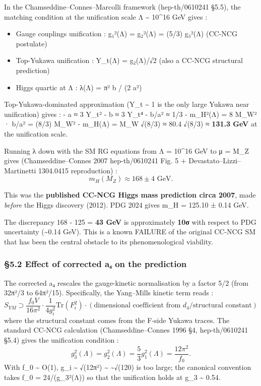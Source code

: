 \documentclass[
  11pt,
  a4paper,
]{article}
\providecommand{\tightlist}{\setlength{\itemsep}{0pt}\setlength{\parskip}{0pt}}
\providecommand{\tightlist}{%
  \setlength{\itemsep}{0pt}\setlength{\parskip}{0pt}}
\begin{document}
In the Chamseddine--Connes--Marcolli framework (hep-th/0610241 §5.5), the matching condition at the unification scale Λ \textasciitilde{} 10\^{}16 GeV gives :

\begin{itemize}
\tightlist
\item
  Gauge couplings unification : g₁²(Λ) = g₂²(Λ) = (5/3) g₃²(Λ) (CC-NCG postulate)
\item
  Top-Yukawa unification : Y\_t(Λ) = g₂(Λ)/√2 (also a CC-NCG structural prediction)
\item
  Higgs quartic at Λ : λ(Λ) = π² b / (2 a²)
\end{itemize}

Top-Yukawa-dominated approximation (Y\_t \textasciitilde{} 1 is the only large Yukawa near unification) gives :
- a ≈ 3 Y\_t²
- b ≈ 3 Y\_t⁴
- b/a² ≈ 1/3
- m\_H²(Λ) = 8 M\_W² · b/a² = (8/3) M\_W²
- m\_H(Λ) = M\_W √(8/3) ≈ 80.4 √(8/3) ≈ \textbf{131.3 GeV} at the unification scale.

Running λ down with the SM RG equations from Λ = 10\^{}16 GeV to μ = M\_Z gives (Chamseddine--Connes 2007 hep-th/0610241 Fig. 5 + Devastato--Lizzi--Martinetti 1304.0415 reproduction) :
\[
m_H(M_Z) \approx 168 \pm 4 \text{ GeV}.
\]

This was the \textbf{published CC-NCG Higgs mass prediction circa 2007}, made \emph{before} the Higgs discovery (2012). PDG 2024 gives m\_H = 125.10 ± 0.14 GeV.

The discrepancy 168 - 125 = \textbf{43 GeV} is approximately \textbf{10σ} with respect to PDG uncertainty (\textasciitilde0.14 GeV). This is a known FAILURE of the original CC-NCG SM that has been the central obstacle to its phenomenological viability.

\hypertarget{effect-of-corrected-aux2084-on-the-prediction}{%
\subsubsection{§5.2 Effect of corrected a₄ on the prediction}\label{effect-of-corrected-aux2084-on-the-prediction}}

The corrected a₄ rescales the gauge-kinetic normalisation by a factor 5/2 (from 32π²/3 to 64π²/15). Specifically, the Yang--Mills kinetic term reads :
\[
S_{YM} \supset \frac{f_0 V}{16\pi^2} \cdot \frac{1}{4 g_i^2} \mathrm{Tr}(F_i^2) \cdot (\text{dimensional coefficient from } d_4 / \text{structural constant})
\]
where the structural constant comes from the F-side Yukawa traces. The standard CC-NCG calculation (Chamseddine--Connes 1996 §4, hep-th/0610241 §5.4) gives the unification condition :
\[
g_3^2(\Lambda) = g_2^2(\Lambda) = \frac{5}{3} g_1^2(\Lambda) = \frac{12 \pi^2}{f_0}.
\]
With f\_0 \textasciitilde{} O(1), g\_i \textasciitilde{} √(12π²) \textasciitilde{} \textasciitilde√(120) is too large; the canonical convention takes f\_0 = 24/(g\_3²(Λ)) so that the unification holds at g\_3 \textasciitilde{} 0.54.
\end{document}
